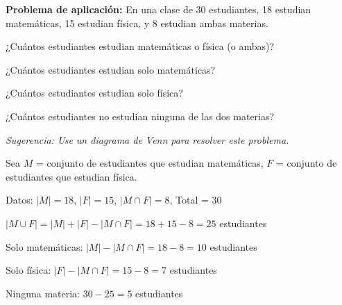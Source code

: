 \begin{exercise}
\problem \textbf{Problema de aplicación:} En una clase de 30 estudiantes, 18 estudian matemáticas, 15 estudian física, y 8 estudian ambas materias.

\begin{exerciselist}
    \item ¿Cuántos estudiantes estudian matemáticas o física (o ambas)?
    \item ¿Cuántos estudiantes estudian solo matemáticas?
    \item ¿Cuántos estudiantes estudian solo física?
    \item ¿Cuántos estudiantes no estudian ninguna de las dos materias?
\end{exerciselist}

\textit{Sugerencia: Use un diagrama de Venn para resolver este problema.}

\begin{solucion}
Sea $M$ = conjunto de estudiantes que estudian matemáticas, $F$ = conjunto de estudiantes que estudian física.

Datos: $|M| = 18$, $|F| = 15$, $|M \cap F| = 8$, Total = 30

\begin{exerciselist}
    \item $|M \cup F| = |M| + |F| - |M \cap F| = 18 + 15 - 8 = 25$ estudiantes
    \item Solo matemáticas: $|M| - |M \cap F| = 18 - 8 = 10$ estudiantes
    \item Solo física: $|F| - |M \cap F| = 15 - 8 = 7$ estudiantes
    \item Ninguna materia: $30 - 25 = 5$ estudiantes
\end{exerciselist}
\end{solucion}
\end{exercise}

